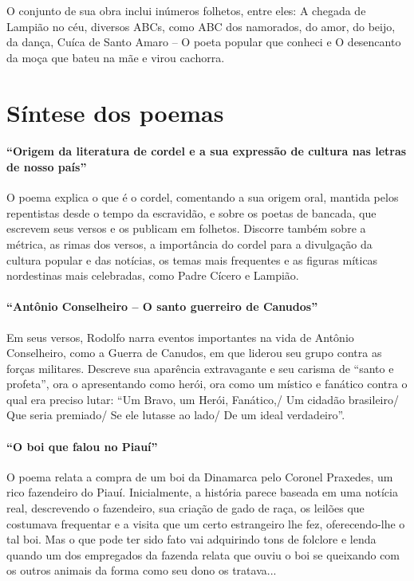 O conjunto de sua obra inclui inúmeros folhetos, entre eles: A chegada
de Lampião no céu, diversos ABCs, como ABC dos namorados, do amor, do
beijo, da dança, Cuíca de Santo Amaro – O poeta popular que conheci e O
desencanto da moça que bateu na mãe e virou cachorra.

\section{Síntese dos poemas}

\medskip

\paragraph{“Origem da literatura de cordel e a sua expressão de cultura nas letras
de nosso país”}

O poema explica o que é o cordel, comentando a sua origem oral, mantida
pelos repentistas desde o tempo da escravidão, e sobre os poetas de
bancada, que escrevem seus versos e os publicam em folhetos. Discorre
também sobre a métrica, as rimas dos versos, a importância do cordel
para a divulgação da cultura popular e das notícias, os temas mais
frequentes e as figuras míticas nordestinas mais celebradas, como Padre
Cícero e Lampião.

\paragraph{“Antônio Conselheiro – O santo guerreiro de Canudos”}

Em seus versos, Rodolfo narra eventos importantes na vida de Antônio
Conselheiro, como a Guerra de Canudos, em que liderou seu grupo contra
as forças militares. Descreve sua aparência extravagante e seu carisma
de “santo e profeta”, ora o apresentando como herói, ora como um
místico e fanático contra o qual era preciso lutar: “Um Bravo, um
Herói, Fanático,/ Um cidadão brasileiro/ Que seria premiado/ Se ele
lutasse ao lado/ De um ideal verdadeiro”.

\paragraph{“O boi que falou no Piauí”}

O poema relata a compra de um boi da Dinamarca pelo Coronel Praxedes, um
rico fazendeiro do Piauí. Inicialmente, a história parece baseada em
uma notícia real, descrevendo o fazendeiro, sua criação de gado de
raça, os leilões que costumava frequentar e a visita que um certo
estrangeiro lhe fez, oferecendo-lhe o tal boi. Mas o que pode ter sido
fato vai adquirindo tons de folclore e lenda quando um dos empregados
da fazenda relata que ouviu o boi se queixando com os outros animais da
forma como seu dono os tratava...

